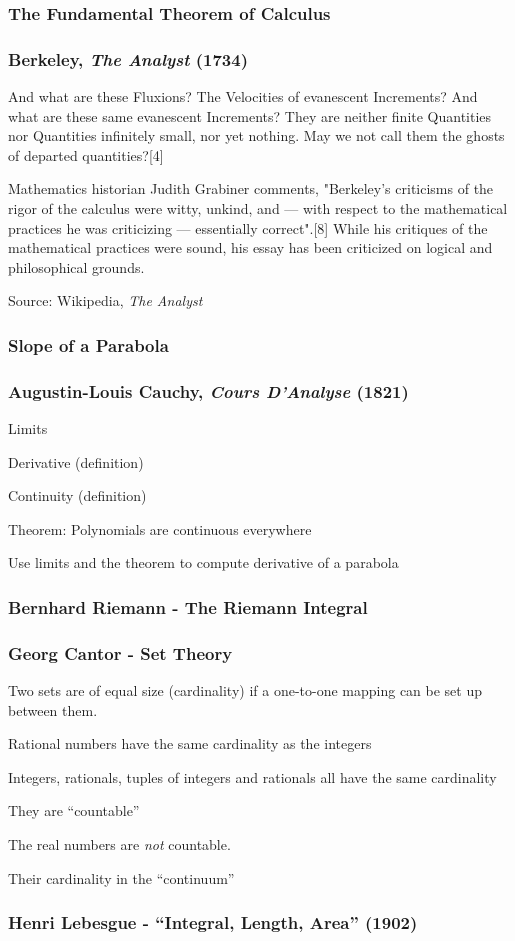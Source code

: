 \documentclass{beamer}
\begin{document}
\begin{frame}
\frametitle{The Fundamental Theorem of Calculus}
\end{frame}

\begin{frame}
\frametitle{Berkeley, {\it The Analyst} (1734)}

    And what are these Fluxions? The Velocities of evanescent Increments? And what are these same evanescent Increments? They are neither finite Quantities nor Quantities infinitely small, nor yet nothing. May we not call them the ghosts of departed quantities?[4]

Mathematics historian Judith Grabiner comments, "Berkeley's criticisms of the rigor of the calculus were witty, unkind, and — with respect to the mathematical practices he was criticizing — essentially correct".[8] While his critiques of the mathematical practices were sound, his essay has been criticized on logical and philosophical grounds. 

Source: Wikipedia, {\it The Analyst}
\end{frame}

\begin{frame}
\frametitle{Slope of a Parabola}
\end{frame}

\begin{frame}
\frametitle{Augustin-Louis Cauchy, {\it Cours D'Analyse} (1821)}

Limits

Derivative (definition)

Continuity (definition)

Theorem: Polynomials are continuous everywhere

Use limits and the theorem to compute derivative of a parabola
\end{frame}

\begin{frame}
\frametitle{Bernhard Riemann - The Riemann Integral}
\end{frame}

\begin{frame}
\frametitle{Georg Cantor - Set Theory}

Two sets are of equal size (cardinality) if a one-to-one mapping can be set up between them.

Rational numbers have the same cardinality as the integers

Integers, rationals, tuples of integers and rationals all have the same cardinality

They are ``countable''

The real numbers are {\it not} countable.

Their cardinality in the ``continuum''
\end{frame}

\begin{frame}
\frametitle{Henri Lebesgue - ``Integral, Length, Area'' (1902)}


\end{frame}
\end{document}
